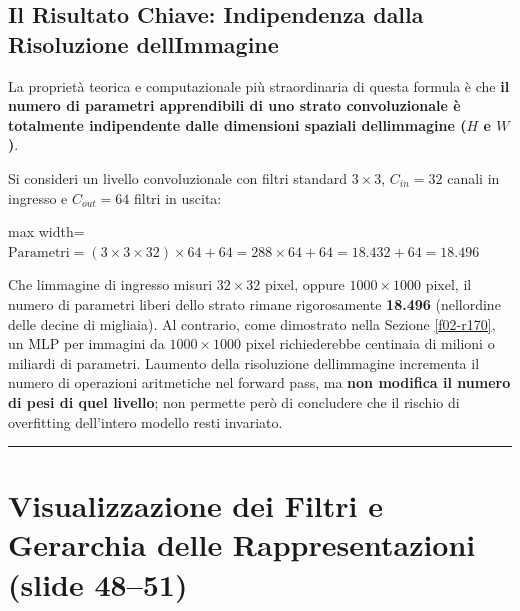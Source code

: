 \documentclass[11pt,a4paper,oneside,openany]{book}
\begin{document}
\subsection{Il Risultato Chiave: Indipendenza dalla Risoluzione dell\textquotesingle Immagine}\label{f02-r643}

La proprietà teorica e computazionale più straordinaria di questa formula è che \textbf{il numero di parametri apprendibili di uno strato convoluzionale è totalmente indipendente dalle dimensioni spaziali dell\textquotesingle immagine (\(H\) e \(W\))}.

Si consideri un livello convoluzionale con filtri standard \(3 \times 3\), \(C_{in} = 32\) canali in ingresso e \(C_{out} = 64\) filtri in uscita:

\begin{center}
\begin{adjustbox}{max width=\linewidth}
$\displaystyle 
\text{Parametri} = (3 \times 3 \times 32) \times 64 + 64 = 288 \times 64 + 64 = 18.432 + 64 = \mathbf{18.496}
$
\end{adjustbox}
\end{center}

Che l\textquotesingle immagine di ingresso misuri \(32 \times 32\) pixel, oppure \(1000 \times 1000\) pixel, il numero di parametri liberi dello strato rimane rigorosamente \textbf{18.496} (nell\textquotesingle ordine delle decine di migliaia). Al contrario, come dimostrato nella Sezione \ref{f02-r170}, un MLP per immagini da \(1000 \times 1000\) pixel richiederebbe centinaia di milioni o miliardi di parametri. L\textquotesingle aumento della risoluzione dell\textquotesingle immagine incrementa il numero di operazioni aritmetiche nel forward pass, ma \textbf{non modifica il numero di pesi di quel livello}; non permette però di concludere che il rischio di overfitting dell'intero modello resti invariato.

\begin{center}\rule{0.5\linewidth}{0.5pt}\end{center}

\section{Visualizzazione dei Filtri e Gerarchia delle Rappresentazioni (slide 48--51)}\label{f02-r657}
\end{document}
